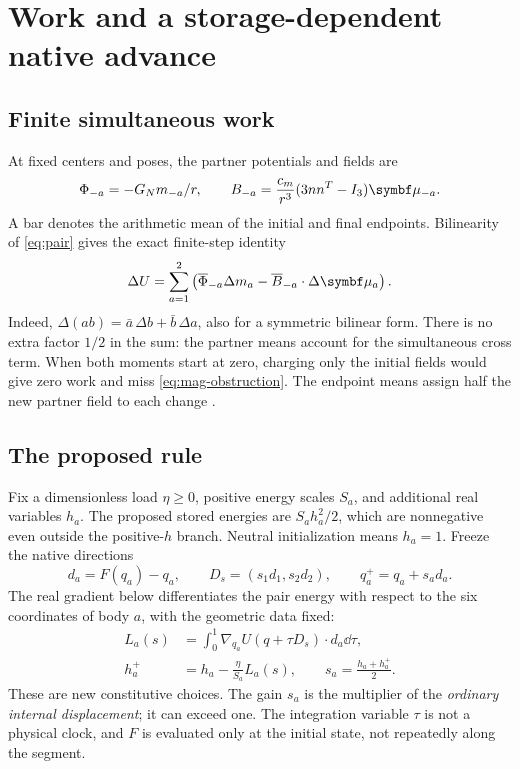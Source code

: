 \section{Work and a storage-dependent native advance}\label{sec:feedback}
\subsection{Finite simultaneous work}
At fixed centers and poses, the partner potentials and fields are
\[
 \Phi_{-a}=-G_Nm_{-a}/r,\qquad
 B_{-a}=\frac{c_m}{r^3}(3nn^T-I_3)\mub_{-a}.
\]
A bar denotes the arithmetic mean of the initial and final endpoints. Bilinearity of \eqref{eq:pair} gives the exact finite-step identity
\begin{equation}
 \Delta U=\sum_{a=1}^2
 \left(\overline{\Phi}_{-a}\Delta m_a
       -\overline B_{-a}\cdot\Delta\mub_a\right).
 \label{eq:finite-work}
\end{equation}
Indeed, \(\Delta(ab)=\bar a\,\Delta b+\bar b\,\Delta a\), also for a symmetric bilinear form. There is no extra factor \(1/2\) in the sum: the partner means account for the simultaneous cross term. When both moments start at zero, charging only the initial fields would give zero work and miss \eqref{eq:mag-obstruction}. The endpoint means assign half the new partner field to each change \cite{GM02}.

\subsection{The proposed rule}
Fix a dimensionless load \(\eta\ge0\), positive energy scales \(S_a\), and additional real variables \(h_a\). The proposed stored energies are \(S_ah_a^2/2\), which are nonnegative even outside the positive-\(h\) branch. Neutral initialization means \(h_a=1\). Freeze the native directions
\begin{equation}
 d_a=F(q_a)-q_a,\qquad D_s=(s_1d_1,s_2d_2),\qquad
 q_a^+=q_a+s_ad_a. \label{eq:frozen}
\end{equation}
The real gradient below differentiates the pair energy with respect to the six coordinates of body \(a\), with the geometric data fixed:
\begin{align}
 L_a(s)&=\int_0^1\nabla_{q_a}U(q+\tau D_s)\cdot d_a\dd\tau, \label{eq:linework}\\
 h_a^+&=h_a-\frac{\eta}{S_a}L_a(s),\qquad
 s_a=\frac{h_a+h_a^+}{2}. \label{eq:feedback}
\end{align}
These are new constitutive choices. The gain \(s_a\) is the multiplier of the \emph{ordinary internal displacement}; it can exceed one. The integration variable \(\tau\) is not a physical clock, and \(F\) is evaluated only at the initial state, not repeatedly along the segment.

